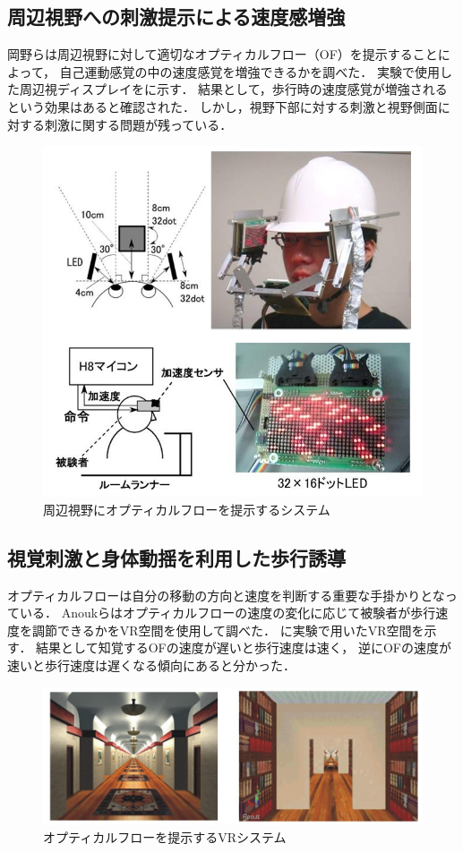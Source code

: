 \subsection{周辺視野への刺激提示による速度感増強}
岡野らは周辺視野に対して適切なオプティカルフロー（OF）を提示することによって，
自己運動感覚の中の速度感覚を増強できるかを調べた\cite{okano}．
実験で使用した周辺視ディスプレイをに示す．
結果として，歩行時の速度感覚が増強されるという効果はあると確認された．
しかし，視野下部に対する刺激と視野側面に対する刺激に関する問題が残っている．
\begin{figure}[H]
    \centering
    \includegraphics[clip, width=0.7\linewidth]{fig/9.PNG}
    \caption{周辺視野にオプティカルフローを提示するシステム}
    \label{fig:oka}
\end{figure}



\subsection{視覚刺激と身体動揺を利用した歩行誘導}
オプティカルフローは自分の移動の方向と速度を判断する重要な手掛かりとなっている\cite{opu}．
Anoukらはオプティカルフローの速度の変化に応じて被験者が歩行速度を調節できるかをVR空間を使用して調べた\cite{Anouk}．
に実験で用いたVR空間を示す．
結果として知覚するOFの速度が遅いと歩行速度は速く，
逆にOFの速度が速いと歩行速度は遅くなる傾向にあると分かった．
\begin{figure}[H]
    \centering
    \includegraphics[clip, width=0.9\linewidth]{fig/12.PNG}
    \caption{オプティカルフローを提示するVRシステム}
    \label{fig:9}
\end{figure}


